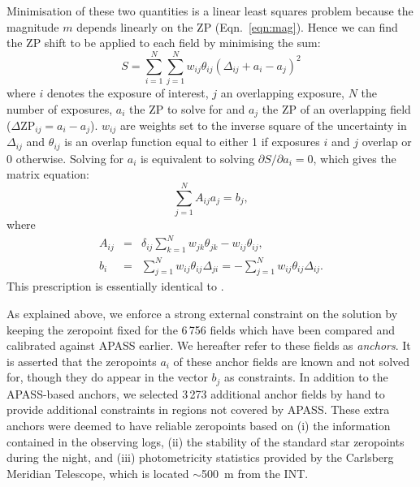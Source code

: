 \documentclass[useAMS,usenatbib]{mn2e}
\begin{document}
Minimisation of these two quantities is a linear least squares problem 
because the magnitude $m$ depends linearly on the ZP (Eqn.~\ref{eqn:mag}).
Hence we can find the ZP shift to be applied to each field 
by minimising the sum:
\begin{equation}
   S = \sum_{i=1}^N \sum_{j=1}^N w_{ij} \theta_{ij} (\Delta_{ij} + a_i - a_j)^2
   \label{eqn:chi2}
\end{equation}
where $i$ denotes the exposure of interest, 
$j$ an overlapping exposure, 
$N$ the number of exposures,
$a_i$ the ZP to solve for 
and $a_j$ the ZP of an overlapping field ($\Delta\mathrm{ZP}_{ij}=a_i-a_j$). 
$w_{ij}$ are weights set to the inverse square of the uncertainty in $\Delta_{ij}$
and $\theta_{ij}$ is an overlap function 
equal to either 1 if exposures $i$ and $j$ overlap or 0 otherwise. 
Solving for $a_i$ is equivalent to solving $\partial
S/\partial a_i=0$, which gives the matrix equation:
\begin{equation}
   \sum_{j=1}^N A_{ij} a_j = b_j,
   \label{eqn:matrix}
\end{equation}
where 
\begin{eqnarray}
   A_{ij} &=& \delta_{ij} \sum_{k=1}^N w_{jk}\theta_{jk} - w_{ij} \theta_{ij},\label{eqn:aij}\\
   b_i &=& \sum_{j=1}^N w_{ij} \theta_{ij}\Delta_{ji} = -\sum_{j=1}^N w_{ij} \theta_{ij}\Delta_{ij}.\label{eqn:bi}
\end{eqnarray}
This prescription is essentially identical to \citet{Glazebrook1994}.

As explained above, we enforce a strong external constraint
on the solution by keeping the zeropoint fixed 
for the 6\,756 fields which have been compared
and calibrated against APASS earlier.
We hereafter refer to these fields as \emph{anchors}.
It is asserted that the zeropoints $a_i$ of these anchor fields 
are known and not solved for,
though they do appear in the vector $b_j$ as constraints.
In addition to the APASS-based anchors, 
we selected 3\,273 additional anchor fields by hand
to provide additional constraints in regions not covered by APASS.
These extra anchors were deemed to have reliable zeropoints 
based on 
(i) the information contained in the observing logs,
(ii) the stability of the standard star zeropoints during the night, and
(iii) photometricity statistics provided by the Carlsberg Meridian Telescope,
which is located $\sim$500~m from the INT.
\end{document}
